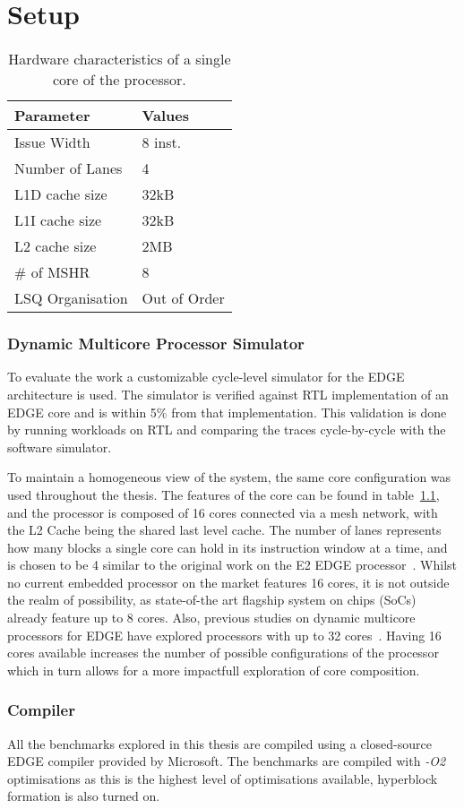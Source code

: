 \chapter{Setup}\label{chp:setup}

\begin{table}[ht]
\centering
\begin{singlespace}
\begin{tabular} { p{5cm}  p{5cm} }
      \toprule
      \textbf{Parameter} & \textbf{Values} \\ \midrule
	  Issue Width & 8 inst. \\
	  Number of Lanes & 4 \\
      L1D cache size & 32kB \\
      L1I cache size & 32kB \\
	  L2 cache size & 2MB \\
	  \# of MSHR & 8 \\
	  LSQ Organisation & Out of Order \\
	  
	  \end{tabular}
	  \end{singlespace}
  \caption{Hardware characteristics of a single core of the processor.}
  \label{tab:processor}
\end{table}

\subsection{Dynamic Multicore Processor Simulator}

To evaluate the work a customizable cycle-level simulator for the EDGE architecture is used.
The simulator is verified against RTL implementation of an EDGE core and is within 5\% from that implementation.
This validation is done by running workloads on RTL and comparing the traces cycle-by-cycle with the software simulator.

To maintain a homogeneous view of the system, the same core configuration was used throughout the thesis.
The features of the core can be found in table~\ref{tab:processor}, and the processor is composed of 16 cores connected via a mesh network, with the L2 Cache being the shared last level cache.
The number of lanes represents how many blocks a single core can hold in its instruction window at a time, and is chosen to be 4 similar to the original work on the E2 EDGE processor~\cite{putnam2010e2}.
Whilst no current embedded processor on the market features 16 cores, it is not outside the realm of possibility, as state-of-the art flagship system on chips (SoCs) already feature up to 8 cores.
Also, previous studies on dynamic multicore processors for EDGE have explored processors with up to 32 cores~\cite{kim2007tflex, gulati2008multitaskingdmc}.
Having 16 cores available increases the number of possible configurations of the processor which in turn allows for a more impactfull exploration of core composition.

\subsection{Compiler}

All the benchmarks explored in this thesis are compiled using a closed-source EDGE compiler provided by Microsoft.
The benchmarks are compiled with \textit{-O2} optimisations as this is the highest level of optimisations available, hyperblock formation is also turned on.
